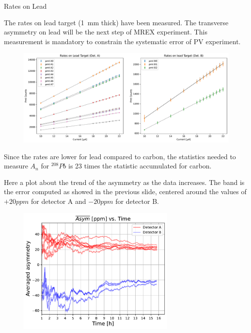 \documentclass[9pt,a4paper]{beamer}
\begin{document}
\begin{frame}[noframenumbering]{Rates on Lead}

The rates on lead target (\SI{1}{\milli \meter} thick) have been measured. The transverse asymmetry on lead will be the next step of MREX experiment. This measurement is mandatory to constrain the systematic error of PV experiment.

\begin{figure}[hbtp]
\centering
\includegraphics[width = \textwidth]{figures/LeadRates.pdf}
\end{figure}

Since the rates are lower for lead compared to carbon, the statistics needed to measure $A_{n}$ for $^{208}Pb$ is 23 times the statistic accumulated for carbon.
\end{frame}

\begin{frame}[noframenumbering]

Here a plot about the trend of the asymmetry as the data increases. The band is the error computed as showed in the previous slide, centered around the values of $+20ppm$ for detector A and $-20ppm$ for detector B.

\begin{figure}[hbtp]
\centering
\includegraphics[width = 0.70\textwidth]{figures/AveragedAsymmetry.pdf}
\end{figure}
\end{frame}
\end{document}
